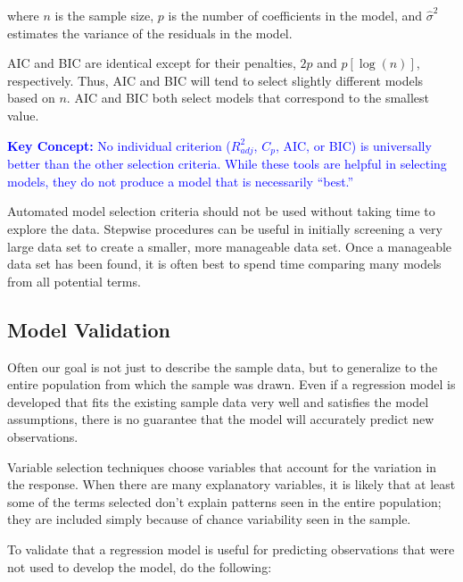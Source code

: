 \documentclass[
]{book}
\begin{document}
where \(n\) is the sample size, \(p\) is the number of coefficients in the model, and \(\hat{\sigma}^2\) estimates the variance of the residuals in the model.

AIC and BIC are identical except for their penalties, \(2p\) and \(p[\log(n)]\), respectively. Thus, AIC and BIC will tend to select slightly different models based on \(n\). AIC and BIC both select models that correspond to the smallest value.

\textbf{\textcolor{blue}{Key Concept:}}
\textcolor{blue}{No individual criterion ($R^2_{adj}$, $C_p$, AIC, or BIC) is universally better than the other selection criteria. While these tools are helpful in selecting models, they do not produce a model that is necessarily “best.”}

Automated model selection criteria should not be used without taking time to explore the data. Stepwise procedures can be useful in initially screening a very large data set to create a smaller, more manageable data set. Once a manageable data set has been found, it is often best to spend time comparing many models from all potential terms.

\hypertarget{model-validation}{%
\subsection*{Model Validation}\label{model-validation}}

Often our goal is not just to describe the sample data, but to generalize to the entire population from which the sample was drawn. Even if a regression model is developed that fits the existing sample data very well and satisfies the model assumptions, there is no guarantee that the model will accurately predict new observations.

Variable selection techniques choose variables that account for the variation in the response. When there are many explanatory variables, it is likely that at least some of the terms selected don't explain patterns seen in the entire population; they are included simply because of chance variability seen in the sample.

To validate that a regression model is useful for predicting observations that were not used to develop
the model, do the following:
\end{document}
